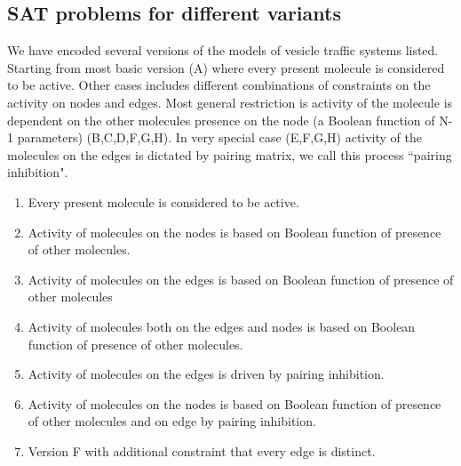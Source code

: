 
\subsection{SAT problems for different variants}

We have encoded several versions of the models of vesicle traffic systems listed. Starting from most basic version (A) where every present molecule is considered to be active. Other cases includes different combinations of constraints on the activity on nodes and edges. Most general restriction is activity of the molecule is dependent on the other molecules presence on the node (a Boolean function of N-1 parameters) (B,C,D,F,G,H). In very special case (E,F,G,H) activity of the molecules on the edges is dictated by pairing matrix, we call this process ``pairing inhibition". 


\begin{enumerate}[label=\Alph*]
\item Every present molecule is considered to be active.
\item Activity of molecules on the nodes is based on Boolean function of presence of other molecules. 
\item Activity of molecules on the edges is based on Boolean function of presence of other molecules
\item Activity of molecules both on the edges and nodes is based on Boolean function of presence of other molecules.
\item Activity of molecules on the edges is driven by pairing inhibition.
\item Activity of molecules on the nodes is based on Boolean function of presence of other molecules and on edge by pairing inhibition.
\item Version F with additional constraint that every edge is distinct.
\end{enumerate}

